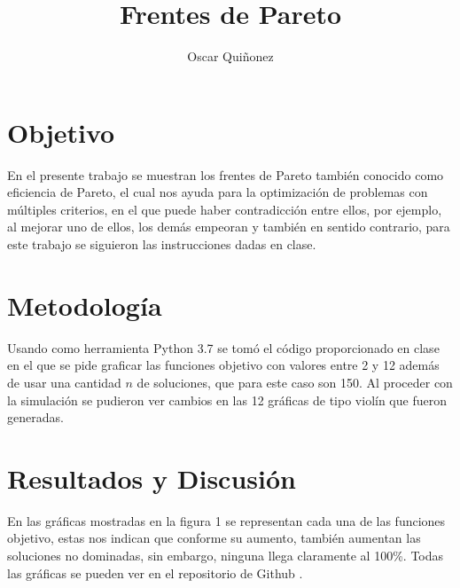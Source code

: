 \documentclass{article}
\title {Frentes de Pareto}
\author{Oscar Qui\~nonez}
\begin{document}
\maketitle
 
\section{Objetivo}\label{met}

En el presente trabajo se muestran los frentes de Pareto tambi\'en conocido como eficiencia de Pareto, el cual nos ayuda para la optimizaci\'on de problemas con m\'ultiples criterios, en el que puede haber contradicci\'on entre ellos, por ejemplo, al mejorar uno de ellos, los dem\'as empeoran y tambi\'en en sentido contrario, para este trabajo se siguieron las instrucciones \cite{satuelisa} dadas en clase. 

\section{Metodolog\'ia}\label{met}

Usando como herramienta Python 3.7 se tom\'o el c\'odigo proporcionado en clase \cite{doctora} en el que se pide graficar las funciones objetivo con valores entre 2 y 12 adem\'as de usar una cantidad $n$ de soluciones, que para este caso son 150. Al proceder con la simulaci\'on se pudieron ver cambios en las 12 gr\'aficas de tipo viol\'in que fueron generadas.

\section{Resultados y Discusi\'on}\label{res}

En las gr\'aficas mostradas en la figura 1 se representan cada una de las funciones objetivo, estas nos indican que conforme su aumento, tambi\'en aumentan las soluciones no dominadas, sin embargo, ninguna llega claramente al 100\%. Todas las gr\'aficas se pueden ver en el repositorio de Github \cite{yo}. 
\end{document}

